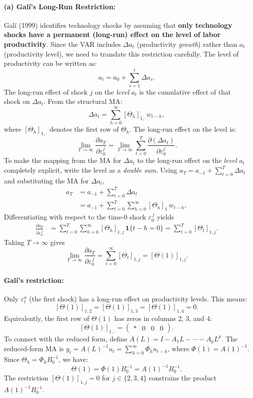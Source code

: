 \documentclass[12pt]{article}
\theoremstyle{definition}
\begin{document}
\paragraph{(a) Galí's Long-Run Restriction:} Galí (1999) identifies technology shocks by assuming that \textbf{only technology shocks have a permanent (long-run) effect on the level of labor productivity}. Since the VAR includes $\Delta a_t$ (productivity \emph{growth}) rather than $a_t$ (productivity level), we need to translate this restriction carefully. The level of productivity can be written as:
\[
a_t = a_0 + \sum_{s=1}^{t} \Delta a_s.
\]
The long-run effect of shock $j$ on the \emph{level} $a_t$ is the cumulative effect of that shock on $\Delta a_t$. From the structural MA:
\[
\Delta a_t = \sum_{h=0}^{\infty} [\Theta_h]_{1,\cdot} w_{t-h},
\]
where $[\Theta_h]_{1,\cdot}$ denotes the first row of $\Theta_h$. The long-run effect on the level is:
\[
\lim_{T\to\infty} \frac{\partial a_T}{\partial \varepsilon_0^j}
= \lim_{T\to\infty}\sum_{t=0}^{T}\frac{\partial(\Delta a_t)}{\partial \varepsilon_0^j}.
\]
To make the mapping from the MA for $\Delta a_t$ to the long-run effect on the \emph{level} $a_t$ completely explicit, write the level as a \emph{double sum}. Using $a_T=a_{-1}+\sum_{t=0}^{T}\Delta a_t$ and substituting the MA for $\Delta a_t$,
\begin{align*}
 a_T
 &= a_{-1}+\sum_{t=0}^{T}\Delta a_t \\
 &= a_{-1}+\sum_{t=0}^{T}\sum_{h=0}^{\infty}[\Theta_h]_{1}\,w_{t-h},
\end{align*}
Differentiating with respect to the time-0 shock $\varepsilon_0^{\,j}$ yields
\begin{align*}
\frac{\partial a_T}{\partial \varepsilon_0^{\,j}}
&=\sum_{t=0}^{T}\sum_{h=0}^{\infty}[\Theta_h]_{1,j}\,\mathbf 1\{t-h=0\}
=\sum_{t=0}^{T}[\Theta_{t}]_{1,j}.
\end{align*}
Taking $T\to\infty$ gives
\[
\lim_{T\to\infty}\frac{\partial a_T}{\partial \varepsilon_0^{\,j}}
=\sum_{t=0}^{\infty}[\Theta_{t}]_{1,j}
=[\Theta(1)]_{1,j}.
\]

\paragraph{Galí's restriction:} Only $\varepsilon_t^a$ (the first shock) has a long-run effect on productivity levels. This means:
\[
\boxed{[\Theta(1)]_{1,2} = [\Theta(1)]_{1,3} = [\Theta(1)]_{1,4} = 0.}
\]
Equivalently, the first row of $\Theta(1)$ has zeros in columns 2, 3, and 4:
\[
[\Theta(1)]_{1,\cdot} = \begin{pmatrix} * & 0 & 0 & 0 \end{pmatrix}.
\]
To connect with the reduced form, define $A(L) = I - A_1 L - \cdots - A_p L^p$. The reduced-form MA is $y_t = A(L)^{-1} u_t = \sum_{h=0}^{\infty} \Phi_h u_{t-h}$, where $\Phi(1) = A(1)^{-1}$. Since $\Theta_h = \Phi_h B_0^{-1}$, we have:
\[
\Theta(1) = \Phi(1) B_0^{-1} = A(1)^{-1} B_0^{-1}.
\]
The restriction $[\Theta(1)]_{1,j} = 0$ for $j \in \{2,3,4\}$ constrains the product $A(1)^{-1} B_0^{-1}$.
\end{document}
